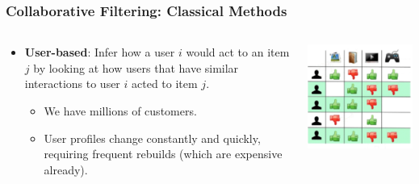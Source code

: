 \documentclass[11pt]{beamer}
\begin{document}
	\begin{frame}
		\frametitle{Collaborative Filtering: Classical Methods}
		\begin{columns}
			\begin{column}{0.5\textwidth}
				\begin{itemize}
					\item \textbf{User-based}: Infer how a user $i$ would act to an item $j$ by looking at how users that have similar interactions to user $i$ acted to item $j$.
					\begin{itemize}
						\item<2-> We have millions of customers.
						\item<3> User profiles change constantly and quickly, requiring frequent rebuilds (which are expensive already).
					\end{itemize}
				\end{itemize}
			\end{column}
			\begin{column}{0.5\textwidth}
				\begin{center}
					\centering
					\includegraphics[width=\textwidth]{images/cf-stage3.png}
				\end{center}
			\end{column}
		\end{columns}
	\end{frame}
\end{document}
